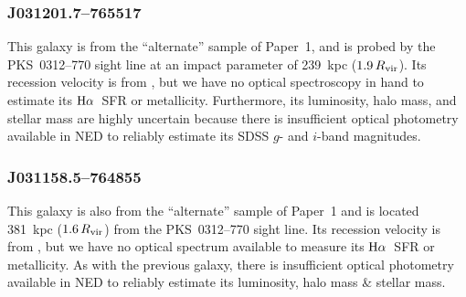 \documentclass[twocolumn,twocolappendix,tighten,times]{aastex6}
\newcommand{\Ha}{\ensuremath{{\rm H}\alpha}}
\begin{document}
\subsubsection{J031201.7--765517}
\label{indiv:galaxies:j0312-76}

This galaxy is from the ``alternate'' sample of Paper~1, and is probed by the 
PKS~0312--770 sight line at an impact parameter of 239~kpc ($1.9\,R_{\rm vir}$).
Its recession velocity is from \citet{prochaska11b}, but we have no optical 
spectroscopy in hand to estimate its \Ha\ SFR or metallicity. Furthermore, 
its luminosity, halo mass, and stellar mass are highly uncertain because 
there is insufficient optical photometry available in NED to reliably 
estimate its SDSS $g$- and $i$-band magnitudes.


\subsubsection{J031158.5--764855}
\label{indiv:galaxies:j0311-76}

This galaxy is also from the ``alternate'' sample of Paper~1 and is located 
381~kpc ($1.6\,R_{\rm vir}$) from the PKS~0312--770 sight line. Its recession 
velocity is from \citet{prochaska11b}, but we have no optical spectrum available 
to measure its \Ha\ SFR or metallicity. As with the previous galaxy, there is 
insufficient optical photometry available in NED to reliably estimate its 
luminosity, halo mass \& stellar mass.


\end{document}
